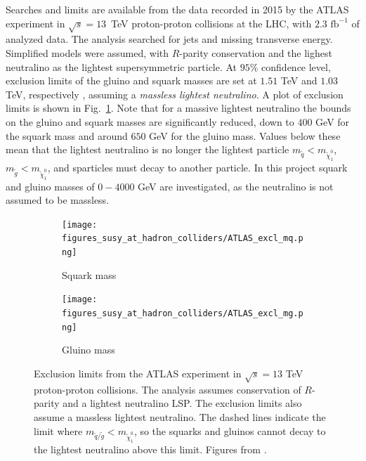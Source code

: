 \documentclass[twoside,english]{uiofysmaster}
\begin{document}
Searches and limits are available from the data recorded in 2015 by the ATLAS experiment in $\sqrt{s}=13$~TeV proton-proton collisions at the LHC, with $2.3 \text{ fb}^{-1}$ of analyzed data. The analysis searched for jets and missing transverse energy. Simplified models were assumed, with $R$-parity conservation and the lighest neutralino as the lightest supersymmetric particle. At $95 \%$ confidence level, exclusion limits of the gluino and squark masses are set at $1.51$ TeV and $1.03$ TeV, respectively \cite{aaboud2016search}, assuming a \textit{massless lightest neutralino}. A plot of exclusion limits is shown in Fig.\ \ref{Fig:: susy hadron : ATLAS exclusion limits}. Note that for a massive lightest neutralino the bounds on the gluino and squark masses are significantly reduced, down to $400$ GeV for the squark mass and around $650$ GeV for the gluino mass. Values below these mean that the lightest neutralino is no longer the lightest particle $m_{\tilde{q}} < m_{\tilde{\chi}^0_1}$, $m_{\tilde{g}} < m_{\tilde{\chi}^0_1}$, and sparticles must decay to another particle. In this project squark and gluino masses of $0-4000$ GeV are investigated, as the neutralino is not assumed to be massless.

\begin{figure}[H]
    \centering
    \begin{subfigure}[b]{0.8\textwidth}
        \texttt{[image: figures\_susy\_at\_hadron\_colliders/ATLAS\_excl\_mq.png]}
        \caption{Squark mass}
    \end{subfigure}
    \begin{subfigure}[b]{0.8\textwidth}
        \texttt{[image: figures\_susy\_at\_hadron\_colliders/ATLAS\_excl\_mg.png]}
        \caption{Gluino mass}
    \end{subfigure}
    \caption{Exclusion limits from the ATLAS experiment in $\sqrt{s} = 13$ TeV proton-proton collisions. The analysis assumes conservation of $R$-parity and a lightest neutralino LSP. The exclusion limits also assume a massless lightest neutralino. The dashed lines indicate the limit where $m_{\tilde{q}/\tilde{g}} < m_{\tilde{\chi}^0_1}$, so the squarks and gluinos cannot decay to the lightest neutralino above this limit. Figures from \cite{aaboud2016search}.}\label{Fig:: susy hadron : ATLAS exclusion limits}
\end{figure}

\end{document}
